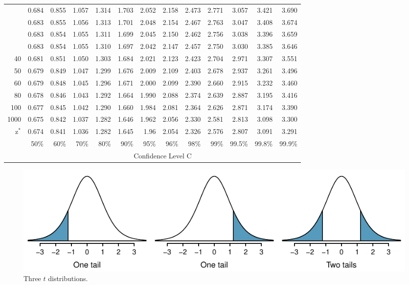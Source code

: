 \begin{center}
{\begin{tabular}{r | rrr rr rrrr rrr}
\gray27	&	0.684	&	0.855	&	1.057	&	1.314	&	1.703	&	2.052	&	2.158	&	2.473	&	2.771	&	3.057	&	3.421	&	3.690	\\
\gray 28	&	0.683	&	0.855	&	1.056	&	1.313	&	1.701	&	2.048	&	2.154	&	2.467	&	2.763	&	3.047	&	3.408	&	3.674	\\
\gray 29	&	0.683	&	0.854	&	1.055	&	1.311	&	1.699	&	2.045	&	2.150	&	2.462	&	2.756	&	3.038	&	3.396	&	3.659	\\
\gray 30	&	0.683	&	0.854	&	1.055	&	1.310	&	1.697	&	2.042	&	2.147	&	2.457	&	2.750	&	3.030	&	3.385	&	3.646	\\
40	&	0.681	&	0.851	&	1.050	&	1.303	&	1.684	&	2.021	&	2.123	&	2.423	&	2.704	&	2.971	&	3.307	&	3.551	\\
50	&	0.679	&	0.849	&	1.047	&	1.299	&	1.676	&	2.009	&	2.109	&	2.403	&	2.678	&	2.937	&	3.261	&	3.496	\\
60	&	0.679	&	0.848	&	1.045	&	1.296	&	1.671	&	2.000	&	2.099	&	2.390	&	2.660	&	2.915	&	3.232	&	3.460	\\
 80	&	0.678	&	0.846	&	1.043	&	1.292	&	1.664	&	1.990	&	2.088	&	2.374	&	2.639	&	2.887	&	3.195	&	3.416	\\
100	&	0.677	&	0.845	&	1.042	&	1.290	&	1.660	&	1.984	&	2.081	&	2.364	&	2.626	&	2.871	&	3.174	&	3.390	\\
 1000	&	0.675	&	0.842	&	1.037	&	1.282	&	1.646	&	1.962	&	2.056	&	2.330	&	2.581	&	2.813	&	3.098	&	3.300	\\
z$^{*}$	&	0.674	&	0.841	&	1.036	&	1.282	&	1.645	&	1.96	&	2.054	&	2.326	&	2.576	&	2.807	&	3.091	&	3.291	\\
\hline
	&	50\%		&	60\%		&	70\%		&	80\%		&	90\%			&	95\%	&	96\%		&	
98\%	&	99\%		&	99.5\%	&	99.8\%	&	99.9\%	\\
\hline
	&	\multicolumn{12}{c}{Confidence Level C}	\\
\hline
\end{tabular}
}
\end{center}








\begin{figure}[h]
\centering
\includegraphics[width=\textwidth]{extraTeX/appendix/figures/tTails/tTails}
\caption{Three $t$ distributions.}
\label{tTails}
\end{figure}


